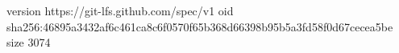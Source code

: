 version https://git-lfs.github.com/spec/v1
oid sha256:46895a3432af6c461ca8c6f0570f65b368d66398b95b5a3fd58f0d67cecea5be
size 3074
